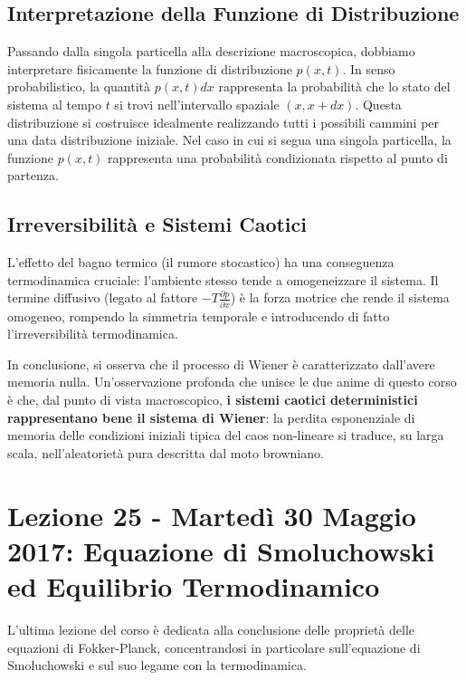 \documentclass[12pt,a4paper]{article}
\begin{document}
\subsection{Interpretazione della Funzione di Distribuzione}
Passando dalla singola particella alla descrizione macroscopica, dobbiamo interpretare fisicamente la funzione di distribuzione $p(x,t)$. 
In senso probabilistico, la quantità $p(x,t)dx$ rappresenta la probabilità che lo stato del sistema al tempo $t$ si trovi nell'intervallo spaziale $(x, x+dx)$. 
Questa distribuzione si costruisce idealmente realizzando tutti i possibili cammini per una data distribuzione iniziale. Nel caso in cui si segua una singola particella, la funzione $p(x,t)$ rappresenta una probabilità condizionata rispetto al punto di partenza.

\subsection{Irreversibilità e Sistemi Caotici}
L'effetto del bagno termico (il rumore stocastico) ha una conseguenza termodinamica cruciale: l'ambiente stesso tende a omogeneizzare il sistema. Il termine diffusivo (legato al fattore $-T \frac{\partial p}{\partial x}$) è la forza motrice che rende il sistema omogeneo, rompendo la simmetria temporale e introducendo di fatto l'irreversibilità termodinamica.

In conclusione, si osserva che il processo di Wiener è caratterizzato dall'avere memoria nulla. Un'osservazione profonda che unisce le due anime di questo corso è che, dal punto di vista macroscopico, \textbf{i sistemi caotici deterministici rappresentano bene il sistema di Wiener}: la perdita esponenziale di memoria delle condizioni iniziali tipica del caos non-lineare si traduce, su larga scala, nell'aleatorietà pura descritta dal moto browniano.

\newpage
\section{Lezione 25 - Martedì 30 Maggio 2017: Equazione di Smoluchowski ed Equilibrio Termodinamico}

L'ultima lezione del corso è dedicata alla conclusione delle proprietà delle equazioni di Fokker-Planck, concentrandosi in particolare sull'equazione di Smoluchowski e sul suo legame con la termodinamica.
\end{document}
